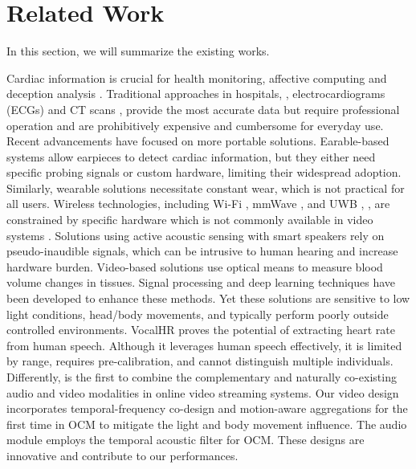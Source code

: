 \section{Related Work}
In this section, we will summarize the existing works.

Cardiac information is crucial for health monitoring, affective computing \cite{yang2022survey, fairclough2020personal} and deception analysis \cite{bian2024ubihr}. 
Traditional approaches in hospitals, \eg, electrocardiograms (ECGs) and CT scans \cite{HeartDiseaseSymptoms}, provide the most accurate data but require professional operation and are prohibitively expensive and cumbersome for everyday use. Recent advancements have focused on more portable solutions.
Earable-based systems \cite{cao2023heartprint, chen2024exploring, fan2023apg} allow earpieces to detect cardiac information, but they either need specific probing signals or custom hardware, limiting their widespread adoption. Similarly, wearable solutions necessitate constant wear, which is not practical for all users. Wireless technologies, including Wi-Fi \cite{liu2015tracking}, mmWave \cite{yang2016monitoring}, and UWB \cite{chen2021movi}, \etc, are constrained by specific hardware which is not commonly available in video systems . 
Solutions using active acoustic sensing \cite{wang2023df, wang2022loear, qian2018acousticcardiogram, zhang2020your} with smart speakers rely on pseudo-inaudible signals, which can be intrusive to human hearing and increase hardware burden.
Video-based solutions use optical means to measure blood volume changes in tissues. Signal processing \cite{de2013robust, li2014remote, wang2016algorithmic, wang2015novel} and deep learning \cite{chen2018deepphys, liu2020multi, niu2020video, li2023learning, yu2019remote,yu2019remoteCompress, yu2023physformer++, liu2023efficientphys, zou2024rhythmformer} techniques have been developed to enhance these methods. Yet these solutions are sensitive to low light conditions, head/body movements, and typically perform poorly outside controlled environments. VocalHR \cite{xu2022hearing} proves the potential of extracting heart rate from human speech. Although it leverages human speech effectively, it is limited by range, requires pre-calibration, and cannot distinguish multiple individuals. 
Differently, \sysname is the first to combine the complementary and naturally co-existing audio and video modalities in online video streaming systems. Our video design incorporates temporal-frequency co-design and motion-aware aggregations for the first time in OCM to mitigate the light and body movement influence. The audio module employs the temporal acoustic filter for OCM. These designs are innovative and contribute to our performances.

